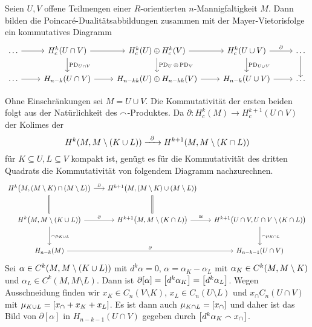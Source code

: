 \begin{proposition}
	Seien $U,V$ offene Teilmengen einer $R$-orientierten $n$-Mannigfaltigkeit $M$. 
	Dann bilden die Poincaré-Dualitätsabbildungen zusammen mit der Mayer-Vietorisfolge ein kommutatives Diagramm
	\[
		\begin{tikzcd}
			\ldots \rar & H^k_c(U \cap V) \rar \dar["\PD_{U \cap V}"] & H^k_c(U) \oplus H^k_c(V) \dar["\PD_{U} \oplus \PD_{V}"] \rar & H^k_c(U \cup V) \rar["\partial"] \dar["\PD_{U \cup V}"]& \ldots \dar \\
			\ldots \rar & H_{n-k}(U \cap V) \rar & H_{n-kk}(U) \oplus H_{n-kk}(V) \rar & H_{n-k}(U \cup V) \rar & \ldots 
		\end{tikzcd}
	\]
\end{proposition}
\begin{beweis}
	Ohne Einschränkungen sei $M=U \cup V$. 
	Die Kommutativität der ersten beiden folgt aus der Natürlichkeit des $\capp$-Produktes.
	Da $\partial \colon H^k_c(M) \to H_c^{k+1}(U \cap V)$ der Kolimes der 
	\[
		H^k(M,M \setminus (K \cup L)) \grenzw{\partial} H^{k+1}(M,M \setminus (K \cap L)) 
	\]
	für $K \subseteq U, L \subseteq V$ kompakt ist, genügt es für die Kommutativität des dritten Quadrats die Kommutativität von folgendem Diagramm nachzurechnen.
	\[
		\begin{tikzcd}[row sep=large,column sep=1.6em]
			H^k \enbrace[\big]{M , (M \setminus K) \cap (M \setminus L)} \rar["\partial"] \dar[equal] & H^{k+1} \enbrace[\big]{M,(M \setminus K) \cup (M \setminus L)} \dar[equal]\\
			H^k \enbrace[\big]{M , M \setminus (K \cup L)} \dar["\capp \mu_{K \cup L}"] \rar["\partial"] & H^{k+1} \enbrace[\big]{M, M \setminus (K \cap L)} \rar["\cong"] & H^{k+1} \enbrace[\big]{U \cap V, U \cap V \setminus (K \cap L)} \dar["\capp \mu_{K \cap L}"] \\
			H_{n-k}(M) \ar[rr,"\partial"] & & H_{n-k-1}(U \cap V)
		\end{tikzcd}
	\]
	Sei $\alpha \in C^{k} \enbrace*{M,M \setminus (K \cup L)}$ mit $d^k\alpha=0$, $\alpha=\alpha_K-\alpha_L$ mit $\alpha_K \in C^k \enbrace*{M,M \setminus K}$ und $\alpha_L \in C^k(M,M \setminus L)$.
	Dann ist $\partial [\alpha]= \benbrace*{d^k \alpha_K} = \benbrace*{d^k \alpha_L}$.
	Wegen Ausschneidung finden wir $x_K \in C_n(V\setminus K)$, $x_L \in C_n(U \setminus L)$ und $x_\cap C_n(U \cap V)$ mit $\mu_{K \cup L} = \benbrace*{x_\cap +x_K+x_L}$.
	Es ist dann auch $\mu_{K \cap L} = \benbrace*{x_\cap}$ und daher ist das Bild von $\partial[\alpha]$ in $H_{n-k-1}(U \cap V)$ gegeben durch $\benbrace*{d^k \alpha_K \capp x_\cap}$.

\end{beweis}
